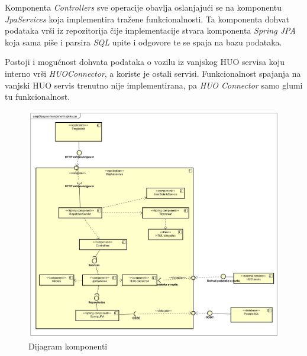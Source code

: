 		Komponenta \textit{Controllers} sve operacije obavlja oslanjajući se na komponentu \textit{JpaServices} koja implementira tražene funkcionalnosti. Ta komponenta dohvat podataka vrši iz repozitorija čije implementacije stvara komponenta \textit{Spring JPA} koja sama piše i parsira \textit{SQL} upite i odgovore te se spaja na bazu podataka.
		
		Postoji i mogućnost dohvata podataka o vozilu iz vanjskog HUO servisa koju interno vrši \textit{HUOConnector}, a koriste je ostali servisi. Funkcionalnost spajanja na vanjski HUO servis trenutno nije implementirana, pa \textit{HUO Connector} samo glumi tu funkcionalnost.
		
		

		\begin{figure}
			\centering
			\includegraphics[width=1.0\linewidth]{dijagrami/component_diagram}
			\caption{Dijagram komponenti}
			\label{fig:componentdiagram}
		\end{figure}

